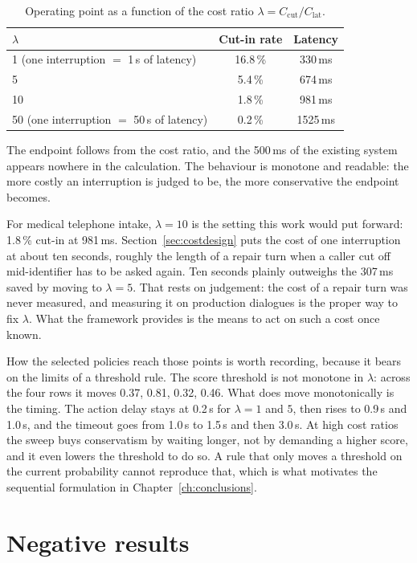 \begin{table}[H]
\centering
\caption{Operating point as a function of the cost ratio
$\lambda = C_{\mathrm{cut}}/C_{\mathrm{lat}}$.}
\label{tab:cost}
\begin{tabular}{@{}lcc@{}}
\toprule
$\lambda$ & Cut-in rate & Latency \\
\midrule
1 (one interruption $=$ 1\,s of latency) & 16.8\,\% & 330\,ms \\
5 & 5.4\,\% & 674\,ms \\
10 & 1.8\,\% & 981\,ms \\
50 (one interruption $=$ 50\,s of latency) & 0.2\,\% & 1525\,ms \\
\bottomrule
\end{tabular}
\end{table}

The endpoint follows from the cost ratio, and the 500\,ms of the existing system appears
nowhere in the calculation. The behaviour is monotone and readable: the more costly an interruption is judged to be, the
more conservative the endpoint becomes.

For medical telephone intake, $\lambda = 10$ is the setting this work would put forward:
1.8\,\% cut-in at 981\,ms. Section~\ref{sec:costdesign} puts the cost of one
interruption at about ten seconds, roughly the length of a repair turn when a caller cut off
mid-identifier has to be asked again. Ten seconds plainly outweighs the 307\,ms saved by
moving to $\lambda = 5$. That rests on judgement: the cost of a repair turn was never
measured, and measuring it on production dialogues is the proper way to fix $\lambda$. What
the framework provides is the means to act on such a cost once known.

How the selected policies reach those points is worth recording, because it bears on the
limits of a threshold rule. The score threshold is not monotone in $\lambda$: across the
four rows it moves 0.37, 0.81, 0.32, 0.46. What does move monotonically is the timing. The
action delay stays at 0.2\,s for $\lambda = 1$ and $5$, then rises to 0.9\,s and 1.0\,s,
and the timeout goes from 1.0\,s to 1.5\,s and then 3.0\,s. At high cost ratios the sweep
buys conservatism by waiting longer, not by demanding a higher score, and it even lowers the
threshold to do so. A rule that only moves a threshold on the current probability cannot
reproduce that, which is what motivates the sequential formulation in
Chapter~\ref{ch:conclusions}.



\section{Negative results}
\label{sec:negative}

